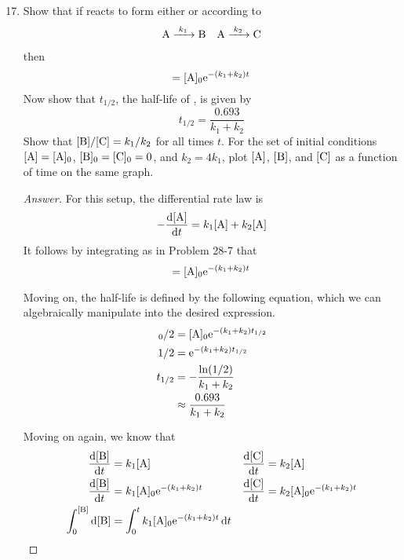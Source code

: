 \documentclass[../psets.tex]{subfiles}
\begin{document}
\begin{enumerate}[label={\textbf{28-\arabic*.}},leftmargin=3.5em]
    \setcounter{enumi}{16}
    \item Show that if  reacts to form either  or  according to
    \begin{align*}
        \ce{A ->[$k_1$] B}&&
        \ce{A ->[$k_2$] C}
    \end{align*}
    then
    \begin{equation*}
        [\ce{A}] = [\ce{A}]_0\e[-(k_1+k_2)t]
    \end{equation*}
    Now show that $t_{1/2}$, the half-life of , is given by
    \begin{equation*}
        t_{1/2} = \frac{0.693}{k_1+k_2}
    \end{equation*}
    Show that $[\ce{B}]/[\ce{C}]=k_1/k_2$ for all times $t$. For the set of initial conditions $[\ce{A}]=[\ce{A}]_0$, $[\ce{B}]_0=[\ce{C}]_0=0$, and $k_2=4k_1$, plot $[\ce{A}]$, $[\ce{B}]$, and $[\ce{C}]$ as a function of time on the same graph.
    \begin{proof}[Answer]
        For this setup, the differential rate law is
        \begin{equation*}
            -\dv{[\ce{A}]}{t} = k_1[\ce{A}]+k_2[\ce{A}]
        \end{equation*}
        It follows by integrating as in Problem 28-7 that
        \begin{equation*}
            [\ce{A}] = [\ce{A}]_0\e[-(k_1+k_2)t]
        \end{equation*}\par
        Moving on, the half-life is defined by the following equation, which we can algebraically manipulate into the desired expression.
        \begin{align*}
            [\ce{A}]_0/2 &= [\ce{A}]_0\e[-(k_1+k_2)t_{1/2}]\\
            1/2 &= \e[-(k_1+k_2)t_{1/2}]\\
            t_{1/2} &= -\frac{\ln(1/2)}{k_1+k_2}\\
            &\approx \frac{0.693}{k_1+k_2}
        \end{align*}\par
        Moving on again, we know that
        \begin{align*}
            \dv{[\ce{B}]}{t} &= k_1[\ce{A}]&
                \dv{[\ce{C}]}{t} &= k_2[\ce{A}]\\
            \dv{[\ce{B}]}{t} &= k_1[\ce{A}]_0\e[-(k_1+k_2)t]&
                \dv{[\ce{C}]}{t} &= k_2[\ce{A}]_0\e[-(k_1+k_2)t]\\
            \int_0^{[\ce{B}]}\dd{[\ce{B}]} &= \int_0^tk_1[\ce{A}]_0\e[-(k_1+k_2)t]\dd{t}&

\end{align*}
\end{proof}
\end{enumerate}
\end{document}

